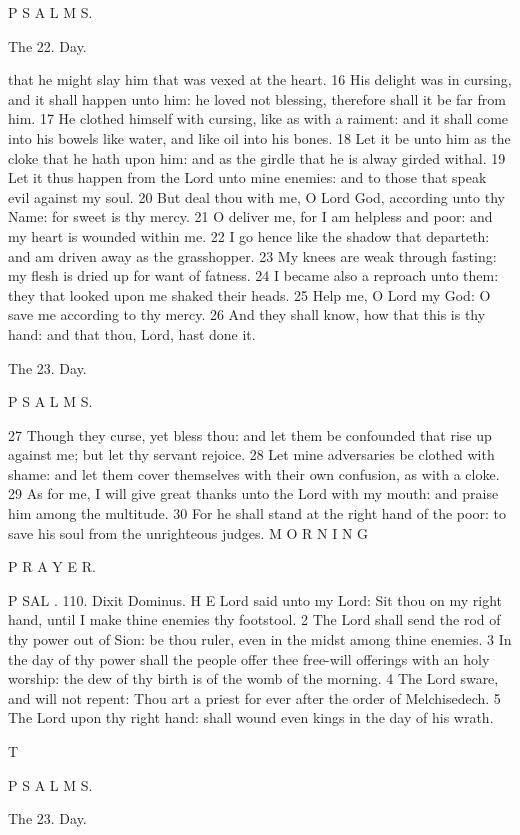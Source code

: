 P S A L M S.

The 22. Day.

that he might slay him that was vexed at the heart. 16 His delight was in cursing, and it shall happen unto him: he loved not blessing, therefore shall it be far from him. 17 He clothed himself with cursing, like as with a raiment: and it shall come into his bowels like water, and like oil into his bones. 18 Let it be unto him as the cloke that he hath upon him: and as the girdle that he is alway girded withal. 19 Let it thus happen from the Lord unto mine enemies: and to those that speak evil against my soul. 20 But deal thou with me, O Lord God, according unto thy Name: for sweet is thy mercy. 21 O deliver me, for I am helpless and poor: and my heart is wounded within me. 22 I go hence like the shadow that departeth: and am driven away as the grasshopper. 23 My knees are weak through fasting: my flesh is dried up for want of fatness. 24 I became also a reproach unto them: they that looked upon me shaked their heads. 25 Help me, O Lord my God: O save me according to thy mercy. 26 And they shall know, how that this is thy hand: and that thou, Lord, hast done it.

The 23. Day.

P S A L M S.

27 Though they curse, yet bless thou: and let them be confounded that rise up against me; but let thy servant rejoice. 28 Let mine adversaries be clothed with shame: and let them cover themselves with their own confusion, as with a cloke. 29 As for me, I will give great thanks unto the Lord with my mouth: and praise him among the multitude. 30 For he shall stand at the right hand of the poor: to save his soul from the unrighteous judges. M O R N I N G

P R A Y E R.

P SAL . 110. Dixit Dominus. H E Lord said unto my Lord: Sit thou on my right hand, until I make thine enemies thy footstool. 2 The Lord shall send the rod of thy power out of Sion: be thou ruler, even in the midst among thine enemies. 3 In the day of thy power shall the people offer thee free-will offerings with an holy worship: the dew of thy birth is of the womb of the morning. 4 The Lord sware, and will not repent: Thou art a priest for ever after the order of Melchisedech. 5 The Lord upon thy right hand: shall wound even kings in the day of his wrath.

T

P S A L M S.

The 23. Day.

